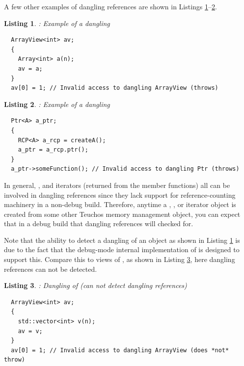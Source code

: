 \documentclass[pdf,ps2pdf,11pt]{SANDreport}
\newtheorem{listing}{Listing}
\begin{document}
A few other examples of dangling references are shown in Listings
{}\ref{listing:Array-dangling-ArrayView}--{}\ref{listing:RCP-dangling-Ptr}.

\begin{listing}: Example of a dangling {} \\
\label{listing:Array-dangling-ArrayView}
{\small\begin{verbatim}
  ArrayView<int> av;
  {
    Array<int> a(n);
    av = a;
  }
  av[0] = 1; // Invalid access to dangling ArrayView (throws)
\end{verbatim}}
\end{listing}

\begin{listing}: Example of a dangling {} \\
\label{listing:RCP-dangling-Ptr}
{\small\begin{verbatim}
  Ptr<A> a_ptr;
  {
    RCP<A> a_rcp = createA();
    a_ptr = a_rcp.ptr();
  }
  a_ptr->someFunction(); // Invalid access to dangling Ptr (throws)
\end{verbatim}}
\end{listing}

In general, {}, {} and iterators
(returned from the {} member functions) all can be
involved in dangling references since they lack support for
reference-counting machinery in a non-debug build.  Therefore, anytime
a {}, {}, or iterator object is created
from some other Teuchos memory management object, you can expect that
in a debug build that dangling references will checked for.

Note that the ability to detect a dangling {} of an
{} object as shown in Listing
{}\ref{listing:Array-dangling-ArrayView} is due to the fact that the
debug-mode internal implementation of {} is designed to
support this.  Compare this to {} views of
{}, as shown in Listing
{}\ref{listing:vector-dangling-ArrayView}, here dangling references
can not be detected.

\begin{listing}: Dangling {} of {}
(can not detect dangling references) \\
\label{listing:vector-dangling-ArrayView}
{\small\begin{verbatim}
  ArrayView<int> av;
  {
    std::vector<int> v(n);
    av = v;
  }
  av[0] = 1; // Invalid access to dangling ArrayView (does *not* throw)
\end{verbatim}}
\end{listing}
\end{document}
